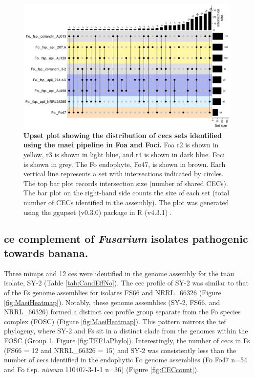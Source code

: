 \begin{figure}
    \centering
    \includegraphics[width=\textwidth]{Figures/UpSetCECofApii.png}
    \captionsetup{width = 22cm}
    \caption[Upset plot of \ac{cec} distribution between \ac{Foa} and \ac{Foci}.]{\textbf{Upset plot showing the distribution of \acp{cec} sets identified using the \ac{maei} pipeline in \ac{Foa} and \ac{Foci}.} \ac{Foa} \ac{r2} is shown in yellow, \ac{r3} is shown in light blue,  and \ac{r4} is shown in dark blue. \ac{Foci} is shown in grey. The \ac{Fo} endophyte, Fo47, is shown in brown. Each vertical line represents a set with intersections indicated by circles. The top bar plot records intersection size (number of shared CECs). The bar plot on the right-hand side counts the size of each set (total number of CECs identified in the assembly). The plot was generated using the ggupset (v0.3.0) \parencite{ggupset} package in R (v4.3.1) \parencite{R}.}
    \label{fig:UpSetCECofFoa}
\end{figure}


\subsection{\Acl{ce} complement of \textit{Fusarium} isolates pathogenic towards banana.} 

 Three \acp{mimp} and 12 \acp{ce} were identified in the genome assembly for the \ac{tnau} isolate, SY-2 (Table \ref{tab:CandEffNo}). The \ac{cec} profile of SY-2 was similar to that of the \ac{Fs} genome assemblies for isolates FS66 and NRRL\_66326 (Figure \ref{fig:MaeiHeatmap}). Notably, these genome assemblies (SY-2, FS66, and NRRL\_66326) formed a distinct \ac{cec} profile group separate from the \ac{Fo} species complex (FOSC) (Figure \ref{fig:MaeiHeatmap}). This pattern mirrors the \ac{tef} phylogeny, where SY-2 and \ac{Fs} sit in a distinct clade from the genomes within the \ac{FOSC} (Group 1, Figure \ref{fig:TEF1aPhylo}). Interestingly, the number of \acp{cec} in \ac{Fs} (FS66 = 12 and NRRL\_66326 = 15) and SY-2 was consistently less than the number of \acp{cec} identified in the endophytic \ac{Fo} genome assemblies (\ac{Fo} Fo47 n=54 and \ac{Fo} f.sp. \textit{niveum} 110407-3-1-1 n=36) (Figure \ref{fig:CECcount}).

